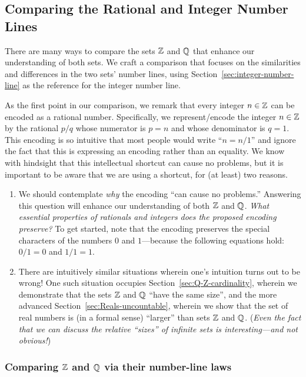 \subsection{Comparing the Rational and Integer Number Lines}
\label{sec:Compare-Q-Z}

There are many ways to compare the sets $\mathbb{Z}$ and $\mathbb{Q}$ that enhance our understanding of both sets.  We craft a comparison that focuses on the similarities and differences in the two sets' number lines, using Section~\ref{sec:integer-number-line} as the reference for the integer number line.

\smallskip

As the first point in our comparison, we remark that every integer $n \in \mathbb{Z}$ can be encoded as a rational number.  Specifically, we represent/encode the integer $n \in \mathbb{Z}$ by the rational $p/q$ whose numerator is $p = n$ and whose denominator is $q = 1$.  This encoding is so intuitive that most people would write ``$n = n/1$'' and ignore the fact that this is expressing an encoding
rather than an equality.  We know with hindsight that this intellectual shortcut can cause no problems, but it is important to be aware that we are using a shortcut, for (at least) two reasons.
\begin{enumerate}
\item
We should contemplate {\em why} the encoding ``can cause no problems.''  Answering this question will enhance our understanding of both $\mathbb{Z}$ and $\mathbb{Q}$.  {\em What essential properties of rationals and integers does the proposed encoding preserve?}  To get started, note that the encoding preserves the special characters of the numbers $0$ and $1$---because the following equations hold: $0/1 = 0$ and $1/1 = 1$.

\medskip\item
There are intuitively similar situations wherein one's intuition turns out to be wrong!  One such situation occupies Section~\ref{sec:Q-Z-cardinality}, wherein we demonstrate that the
sets $\mathbb{Z}$ and $\mathbb{Q}$ ``have the same size'', and the more advanced Section~\ref{sec:Reals-uncountable}, wherein we show that the set of real numbers is (in a formal sense) ``larger'' than sets $\mathbb{Z}$ and $\mathbb{Q}$.  ({\em Even the fact that we can discuss the relative ``sizes'' of infinite sets is interesting---and not obvious!})
\end{enumerate}

\subsubsection{Comparing $\mathbb{Z}$ and $\mathbb{Q}$ via their number-line laws}
\label{sec:Q-Z-laws}

